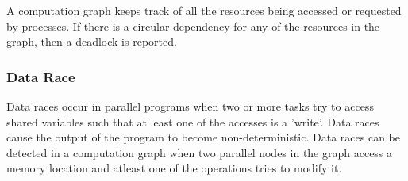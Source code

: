 A computation graph keeps track of all the resources being accessed or requested by processes. If there is a circular dependency for any of the resources in the graph, then a deadlock is reported.

\subsubsection{Data Race}
Data races occur in parallel programs when two or more tasks try to access shared variables such that at least one of the accesses is a 'write'. Data races cause the output of the program to become non-deterministic. Data races can be detected in a computation graph when two parallel nodes in the graph access a memory location and atleast one of the operations tries to modify it.
